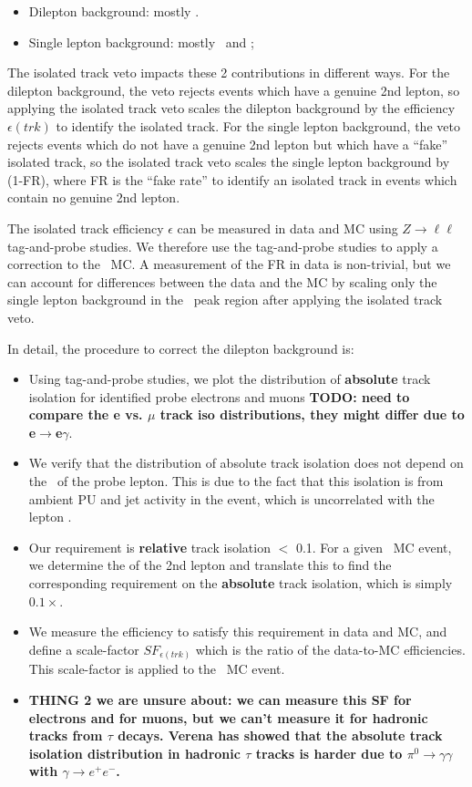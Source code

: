 \begin{itemize}
\item Dilepton background: mostly \ttll.
\item Single lepton background: mostly \ttlj\ and \wjets;
\end{itemize}

The isolated track veto impacts these 2 contributions in different ways. For the dilepton background, the veto
rejects events which have a genuine 2nd lepton, so applying the isolated track veto scales the dilepton background
by the efficiency $\epsilon(trk)$ to identify the isolated track. For the single lepton background, the veto rejects events
which do not have a genuine 2nd lepton but which have a ``fake'' isolated track, so the isolated track veto scales
the single lepton background by (1-FR), where FR is the ``fake rate'' to identify an isolated track in events which 
contain no genuine 2nd lepton. 

The isolated track efficiency $\epsilon$ can be measured in data and MC using $Z\to\ell\ell$ tag-and-probe studies. 
We therefore use the tag-and-probe studies to apply a correction to the \ttll\ MC. 
A measurement of the FR in data is non-trivial, but we can account for differences between the data and the MC by scaling 
only the single lepton background in the \mt\ peak region after applying the isolated track veto.

In detail, the procedure to correct the dilepton background is:

\begin{itemize}
\item Using tag-and-probe studies, we plot the distribution of {\bf absolute} track isolation for identified probe electrons
and muons {\bf TODO: need to compare the e vs. $\mu$ track iso distributions, they might differ due to e$\to$e$\gamma$}.
\item We verify that the distribution of absolute track isolation does not depend on the \pt\ of the probe lepton.
This is due to the fact that this isolation is from ambient PU and jet activity in the event, which is uncorrelated with
the lepton .
\item Our requirement is {\bf relative} track isolation $<$ 0.1. For a given \ttll\ MC event, we determine the \pt of the 2nd
lepton and translate this to find the corresponding requirement on the {\bf absolute} track isolation, which is simply $0.1\times$\pt.
\item We measure the efficiency to satisfy this requirement in data and MC, and define a scale-factor $SF_{\epsilon(trk)}$ which
is the ratio of the data-to-MC efficiencies. This scale-factor is applied to the \ttll\ MC event.
\item {\bf THING 2 we are unsure about: we can measure this SF for electrons and for muons, but we can't measure it for hadronic 
tracks from $\tau$ decays. Verena has showed that the absolute track isolation distribution in hadronic $\tau$ tracks is harder due 
to $\pi^0\to\gamma\gamma$ with $\gamma\to e^+e^-$.}
\end{itemize} 

